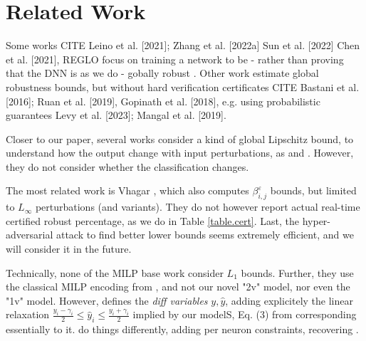\section{Related Work}

Some works CITE
Leino et al. [2021]; Zhang et al. [2022a] Sun et al. [2022]  Chen et al. [2021], REGLO focus on training a network to be - rather than proving that the DNN is as we do - gobally robust .
Other work estimate global robustness bounds, but without hard verification certificates CITE Bastani et al. [2016]; Ruan et al. [2019], Gopinath et al. [2018], e.g. using probabilistic guarantees  Levy et al. [2023]; Mangal et al. [2019].

Closer to our paper, several works consider a kind of global Lipschitz bound, to understand how the output change with input perturbations, as \cite{marabou} and \cite{ITNE,GROCET}. However, they do not consider whether the classification changes. 

The most related work is Vhagar \cite{Vhagar}, which also computes $\beta^\varepsilon_{i,j}$ bounds, but limited to $L_\infty$ perturbations (and variants). They do not however report actual 
real-time certified robust percentage, as we do in Table \ref{table.cert}. Last, the hyper-adversarial attack to find better lower bounds seems extremely efficient, and we will consider it in the future.

Technically, none of the MILP base work \cite{Vhagar,ITNE,GROCET} 
consider $L_1$ bounds. Further, they use the classical MILP encoding from \cite{MILP}, and not our novel "2v" model, nor even the "1v" model. However, \cite{ITNE,GROCET} 
defines the {\em diff variables} $y,\hat{y}$, adding explicitely the linear relaxation $\frac{y_i-\gamma_i}{2} \leq \hat{y}_i \leq \frac{y_i+\gamma_i}{2}$ implied by our modelS, Eq. (3) from \cite{ITNE} corresponding essentially to it. \cite{Vhagar} do things differently, adding per neuron constraints, recovering . 


